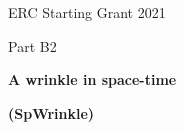 \documentclass[a4paper,11pt]{article}
\newcommand\BackImage[2][scale=1]{%
\BgThispage
\backgroundsetup{
  contents={\texttt{[image: \#2]}}
  }
}
\begin{document}

\renewcommand{\headrulewidth}{0pt}



\centerline{\huge ERC Starting Grant 2021}
\centerline{\huge Part B2}
\centerline{\Large }
\centerline{\huge \textbf{A wrinkle in space-time}}
\centerline{\Large \textbf{(SpWrinkle)}}

\vspace{0.5cm}
%
%
  





\end{document}
